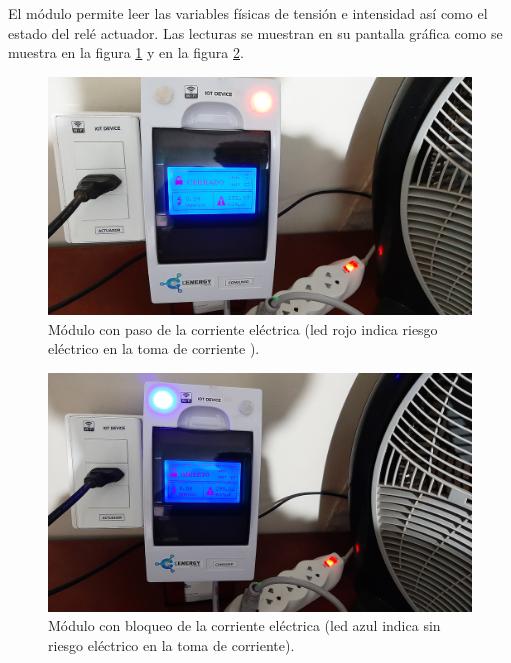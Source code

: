 El módulo permite leer las variables físicas de tensión e intensidad así como el estado del relé actuador. Las lecturas se muestran en su pantalla gráfica como se muestra en la figura \ref{fig:test-activa1} y en la figura \ref{fig:test-activa2}.
\vspace{0.5cm}
\begin{figure}[htpb]
\centering 
\includegraphics[width=1.0\textwidth]{./Figures/test/consumo/paso.png}
\caption{Módulo con paso de la corriente eléctrica (led rojo indica riesgo eléctrico en la toma de corriente ).}
\label{fig:test-activa1}
\end{figure}

\vspace{0.5cm}
\begin{figure}[htpb]
\centering 
\includegraphics[width=1.0\textwidth]{./Figures/test/consumo/bloqueo.png}
\caption{Módulo con bloqueo de la corriente eléctrica (led azul indica sin riesgo eléctrico en la toma de corriente).}
\label{fig:test-activa2}
\end{figure}

\vspace{0.5cm}
